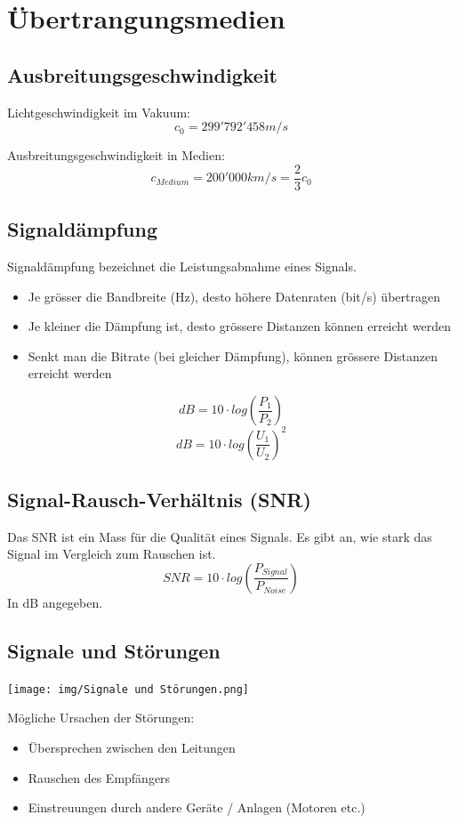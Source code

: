 
\section{Übertrangungsmedien}
\subsection{Ausbreitungsgeschwindigkeit}
{Lichtgeschwindigkeit im Vakuum:
    $$ c_0 = 299'792'458 m/s $$
}

{Ausbreitungsgeschwindigkeit in Medien: \\
    $$ c_{Medium} = 200'000 km/s = \frac{2}{3} c_0 $$}

\subsection{Signaldämpfung}{
    {Signaldämpfung bezeichnet die Leistungsabnahme eines Signals.}
    \begin{itemize}[noitemsep]
        \item Je grösser die Bandbreite (Hz), desto höhere Datenraten (bit/s) übertragen
        \item Je kleiner die Dämpfung ist, desto grössere Distanzen können erreicht werden
        \item Senkt man die Bitrate (bei gleicher Dämpfung), können grössere Distanzen erreicht werden
    \end{itemize}}
$$ dB = 10 \cdot log(\frac{P_1}{P_2})$$
$$ dB = 10 \cdot log(\frac{U_1}{U_2})^2$$

\subsection{Signal-Rausch-Verhältnis (SNR)}{
    {Das SNR ist ein Mass für die Qualität eines Signals. Es gibt an, wie stark das Signal im Vergleich zum Rauschen ist. }
    $$ SNR = 10 \cdot log(\frac{P_{Signal}}{P_{Noise}}) $$
    In dB  angegeben.
}

\subsection{Signale und Störungen}{

    {\texttt{[image: img/Signale und Störungen.png]}}

    Mögliche Ursachen der Störungen:
    \begin{itemize}[noitemsep]
        \item Übersprechen zwischen den Leitungen
        \item Rauschen des Empfängers
        \item Einstreuungen durch andere Geräte / Anlagen (Motoren etc.)
    \end{itemize}

}

